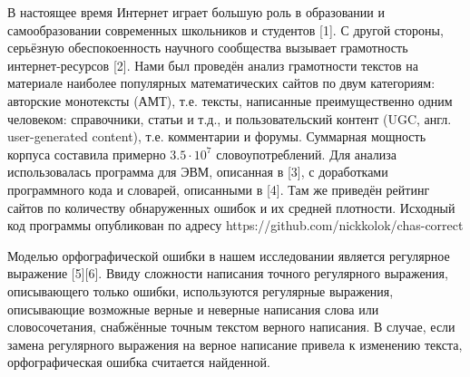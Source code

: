 



\vzmscaption

\setcounter{table}{0}


В настоящее время Интернет играет большую роль в образовании и самообразовании современных школьников и студентов [1].
С другой стороны, серьёзную обеспокоенность научного сообщества вызывает грамотность интернет-ресурсов [2].
Нами был проведён анализ грамотности текстов на материале наиболее популярных математических сайтов по двум категориям:
авторские монотексты (АМТ), т.е. тексты, написанные преимущественно одним человеком: справочники, статьи и т.д.,
и пользовательский контент
\linebreak
(UGC, англ. user-generated content), т.е. комментарии и форумы.
Суммарная мощность корпуса составила примерно $3.5\cdot 10^7$ словоупотреблений.
Для анализа использовалась программа для ЭВМ, описанная в [3], с доработками программного кода и словарей, описанными в [4].
Там же приведён рейтинг сайтов по количеству обнаруженных ошибок и их средней плотности.
Исходный код программы опубликован по адресу https://github.com/nickkolok/chas-correct

Моделью орфографической ошибки в нашем исследовании является регулярное выражение [5][6].
Ввиду сложности написания точного регулярного выражения,
описывающего только ошибки, используются регулярные выражения,
описывающие возможные верные и неверные написания слова или словосочетания,
снабжённые точным текстом верного написания.
В случае, если замена регулярного выражения на верное написание привела к изменению текста,
орфографическая ошибка считается найденной.

